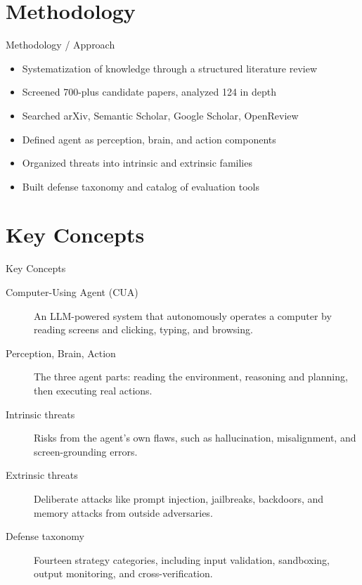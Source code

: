 \documentclass[10pt]{beamer}
\begin{document}
\section{Methodology}
\begin{frame}[allowframebreaks]{Methodology / Approach}
\begin{itemize}
  \item Systematization of knowledge through a structured literature review
  \item Screened 700-plus candidate papers, analyzed 124 in depth
  \item Searched arXiv, Semantic Scholar, Google Scholar, OpenReview
  \item Defined agent as perception, brain, and action components
  \item Organized threats into intrinsic and extrinsic families
  \item Built defense taxonomy and catalog of evaluation tools
\end{itemize}
\end{frame}

\section{Key Concepts}
\begin{frame}[allowframebreaks]{Key Concepts}
  \begin{description}
    \item[Computer-Using Agent (CUA)] An LLM-powered system that autonomously operates a computer by reading screens and clicking, typing, and browsing.
    \item[Perception, Brain, Action] The three agent parts: reading the environment, reasoning and planning, then executing real actions.
    \item[Intrinsic threats] Risks from the agent's own flaws, such as hallucination, misalignment, and screen-grounding errors.
    \item[Extrinsic threats] Deliberate attacks like prompt injection, jailbreaks, backdoors, and memory attacks from outside adversaries.
    \item[Defense taxonomy] Fourteen strategy categories, including input validation, sandboxing, output monitoring, and cross-verification.
  \end{description}
\end{frame}
\end{document}

